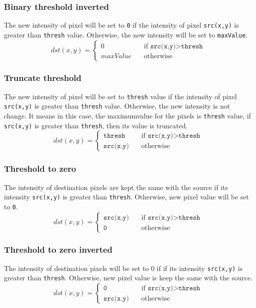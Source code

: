 \subsubsection{Binary threshold inverted}
The new intensity of pixel will be set to \texttt{0} if the intensity of pixel \texttt{src(x,y)} is greater than \texttt{thresh} value. Otherwise, the new intensity will be set to \texttt{maxValue}.
\begin{equation}	
		dst(x,y) = 
		\begin{cases}
			0 & \quad \text{if }\texttt{src(x,y)} > \texttt{thresh} \\
			maxValue & \quad \text{otherwise}
		\end{cases}	
\end{equation}
\subsubsection{Truncate threshold}
The new intensity of pixel will be set to \texttt{thresh} value if the intensity of pixel \texttt{src(x,y)} is greater than \texttt{thresh} value. Otherwise, the new intensity is not change. It means in this case, the maximumvalue for the pixels is \texttt{thresh} value, if \texttt{src(x,y)} is greater than \texttt{thresh}, then its value is truncated.
\begin{equation}	
		dst(x,y) = 
		\begin{cases}
			\texttt{thresh} & \quad \text{if }\texttt{src(x,y)} > \texttt{thresh} \\
			\texttt{src(x,y)} & \quad \text{otherwise}
		\end{cases}	
\end{equation}
\subsubsection{Threshold to zero}
The intensity of destination pixels are kept the same with the source if its intensity \texttt{src(x,y)} is greater than \texttt{thresh}. Otherwise, new pixel value will be set to \texttt{0}.
\begin{equation}	
		dst(x,y) = 
		\begin{cases}
			\texttt{src(x,y)} & \quad \text{if }\texttt{src(x,y)} > \texttt{thresh} \\
			\texttt{0} & \quad \text{otherwise}
		\end{cases}	
\end{equation}
\subsubsection{Threshold to zero inverted}
The intensity of destination pixels will be set to 0 if if its intensity \texttt{src(x,y)} is greater than \texttt{thresh}. Otherwise, new pixel value is keep the same with the source.
\begin{equation}	
		dst(x,y) = 
		\begin{cases}
			\texttt{0} & \quad \text{if }\texttt{src(x,y)} > \texttt{thresh} \\
			\texttt{src(x,y)} & \quad \text{otherwise}
		\end{cases}	
\end{equation}
